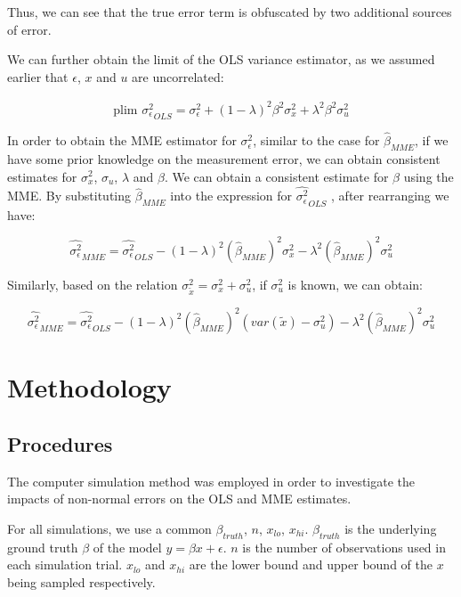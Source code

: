 \documentclass{article}
\begin{document}
Thus, we can see that the true error term is obfuscated by two additional sources of error. 

We can further obtain the limit of the OLS variance estimator, as we assumed earlier that $\epsilon$, $x$ and $u$ are uncorrelated:

\begin{equation}
    \textrm{plim } \hat{\sigma^2_\epsilon}_{OLS} = \sigma_\epsilon^2 + (1-\lambda)^2 \beta^2 \sigma_x^2 + \lambda^2 \beta^2 \sigma_u^2   
\end{equation}

In order to obtain the MME estimator for $\sigma^2_\epsilon$, similar to the case for $\hat{\beta}_{MME}$, if we have some prior knowledge on the measurement error, we can obtain consistent estimates for $\sigma_x^2$, $\sigma_u$, $\lambda$ and $\beta$.
We can obtain a consistent estimate for $\beta$ using the MME.
By substituting $\hat{\beta}_{MME}$ into the expression for $\hat{\sigma^2_\epsilon}_{OLS}$ \cite{mmereport}, after rearranging we have:

\begin{equation}
    \label{eq:sigma_MME}
    \hat{\sigma_\epsilon^2}_{MME} = \hat{\sigma^2_\epsilon}_{OLS} -  (1-\lambda)^2 (\hat{\beta}_{MME})^2 \sigma_x^2 - \lambda^2 (\hat{\beta}_{MME})^2 \sigma_u^2   
\end{equation}

Similarly, based on the relation $\sigma^2_{\tilde{x}} = \sigma^2_x + \sigma^2_u$,
if $\sigma^2_u$ is known, we can obtain:

\begin{equation}
    \hat{\sigma_\epsilon^2}_{MME} = \hat{\sigma^2_\epsilon}_{OLS} -  (1-\lambda)^2 (\hat{\beta}_{MME})^2 (var(\tilde{x}) - \sigma^2_u) - \lambda^2 (\hat{\beta}_{MME})^2 \sigma_u^2
\end{equation}

\section{Methodology}

\subsection{Procedures}

The computer simulation method was employed in order to investigate the impacts of non-normal errors on the OLS and MME estimates.

For all simulations, we use a common $\beta_{truth}$, $n$, $x_{lo}$, $x_{hi}$. $\beta_{truth}$ is the underlying ground truth $\beta$ of the model $y=\beta x + \epsilon$. $n$ is the number of observations used in each simulation trial. $x_{lo}$ and $x_{hi}$ are the lower bound and upper bound of the $x$ being sampled respectively.
\end{document}
